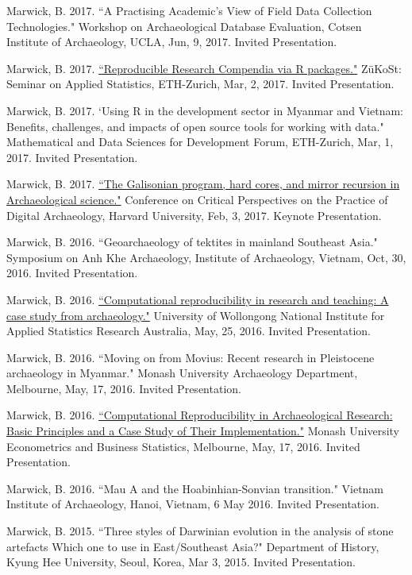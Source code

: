 \ind Marwick, B. 2017. ``A Practising Academic’s View of Field Data Collection Technologies." Workshop on Archaeological Database Evaluation, Cotsen Institute of Archaeology, UCLA,  Jun, 9, 2017. Invited Presentation.

\ind Marwick, B. 2017. \href{https://github.com/benmarwick/ETH-Zurich-ZuKoSt-Reproducible-Research-Compendia-via-R-packages}{``Reproducible Research Compendia via R packages."} ZüKoSt: Seminar on Applied Statistics, ETH-Zurich,  Mar, 2, 2017. Invited Presentation.

\ind Marwick, B. 2017. `Using R in the development sector in Myanmar and Vietnam: Benefits, challenges, and impacts of open source tools for working with data." Mathematical and Data Sciences for Development Forum, ETH-Zurich,  Mar, 1, 2017. Invited Presentation.

\ind Marwick, B. 2017. \href{https://www.youtube.com/watch?v=k3Wv4Cnr0Nc}{``The Galisonian program, hard cores, and mirror recursion in Archaeological science."} Conference on Critical Perspectives on the Practice of Digital Archaeology, Harvard University,  Feb, 3, 2017. Keynote Presentation.

\ind Marwick, B. 2016. ``Geoarchaeology of tektites in mainland Southeast Asia." Symposium on Anh Khe Archaeology, Institute of Archaeology, Vietnam, Oct, 30, 2016. Invited Presentation.

\ind Marwick, B. 2016. \href{https://github.com/benmarwick/UOW-NIASRA-2016-talk}{``Computational reproducibility in research and teaching: A case study from archaeology."} University of Wollongong National Institute for Applied Statistics Research Australia, May, 25, 2016. Invited Presentation.

\ind Marwick, B. 2016. ``Moving on from Movius: Recent research in Pleistocene archaeology in Myanmar." Monash University Archaeology Department, Melbourne, May, 17, 2016. Invited Presentation.

\ind Marwick, B. 2016. \href{https://github.com/benmarwick/Monash-Wombat-2016-talk}{``Computational Reproducibility in Archaeological Research: Basic Principles and a Case Study of Their Implementation."} Monash University Econometrics and Business Statistics, Melbourne, May, 17, 2016. Invited Presentation.

\ind Marwick, B. 2016. ``Mau A and the Hoabinhian-Sonvian transition." Vietnam Institute of Archaeology, Hanoi, Vietnam, 6 May 2016. Invited Presentation.

\ind Marwick, B. 2015. ``Three styles of Darwinian evolution in the analysis of stone artefacts Which one to use in East/Southeast Asia?" Department of History, Kyung Hee University, Seoul, Korea, Mar 3, 2015. Invited Presentation.

